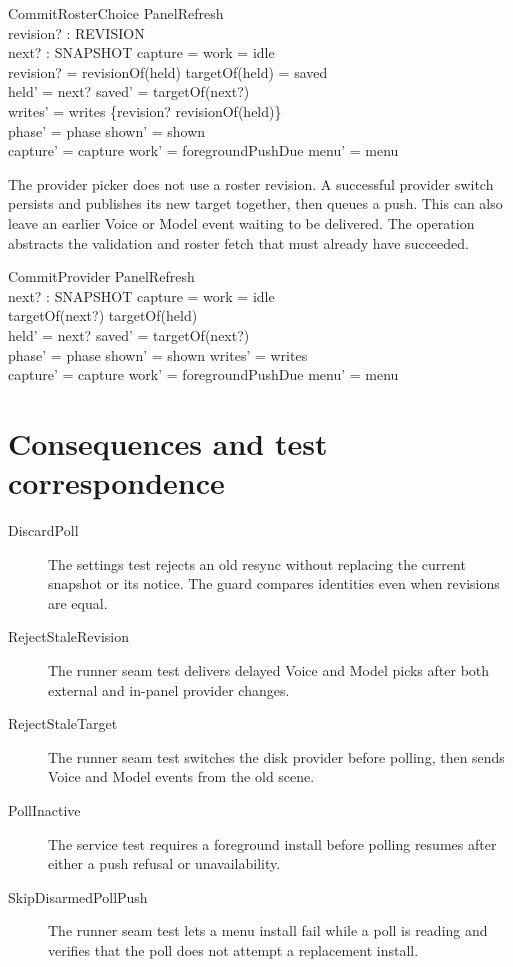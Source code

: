 \documentclass[a4paper,10pt,fleqn]{article}
\begin{document}
\begin{schema}{CommitRosterChoice}
  \Delta PanelRefresh \\
  revision? : REVISION \\
  next? : SNAPSHOT
\where
  capture = \emptyset \land work = idle \\
  revision? = revisionOf(held) \land targetOf(held) = saved \\
  held' = next? \land saved' = targetOf(next?) \\
  writes' = writes \cup \{revision? \mapsto revisionOf(held)\} \\
  phase' = phase \land shown' = shown \\
  capture' = capture \land work' = foregroundPushDue \land menu' = menu
\end{schema}

The provider picker does not use a roster revision. A successful
provider switch persists and publishes its new target together, then
queues a push. This can also leave an earlier Voice or Model event
waiting to be delivered. The operation abstracts the validation and
roster fetch that must already have succeeded.

\begin{schema}{CommitProvider}
  \Delta PanelRefresh \\
  next? : SNAPSHOT
\where
  capture = \emptyset \land work = idle \\
  targetOf(next?) \neq targetOf(held) \\
  held' = next? \land saved' = targetOf(next?) \\
  phase' = phase \land shown' = shown \land writes' = writes \\
  capture' = capture \land work' = foregroundPushDue \land menu' = menu
\end{schema}

\section{Consequences and test correspondence}

\begin{description}
\item[DiscardPoll] The settings test rejects an old resync without
replacing the current snapshot or its notice. The guard compares
identities even when revisions are equal.
\item[RejectStaleRevision] The runner seam test delivers delayed Voice
and Model picks after both external and in-panel provider changes.
\item[RejectStaleTarget] The runner seam test switches the disk provider
before polling, then sends Voice and Model events from the old scene.
\item[PollInactive] The service test requires a foreground install
before polling resumes after either a push refusal or unavailability.
\item[SkipDisarmedPollPush] The runner seam test lets a menu install
fail while a poll is reading and verifies that the poll does not
attempt a replacement install.
\end{description}
\end{document}
